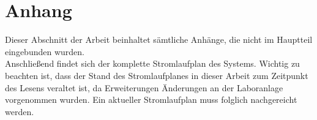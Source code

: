 \documentclass[../Bachelorarbeit.tex]{subfiles}
\begin{document}
\section*{Anhang} \label{anhang}
Dieser Abschnitt der Arbeit beinhaltet sämtliche Anhänge, die nicht im Hauptteil eingebunden wurden.\\
Anschließend findet sich der komplette Stromlaufplan des Systems. Wichtig zu beachten ist, dass der Stand des Stromlaufplanes in dieser Arbeit zum Zeitpunkt des Lesens veraltet ist, da Erweiterungen \bzw Änderungen an der Laboranlage vorgenommen wurden. Ein aktueller Stromlaufplan muss folglich nachgereicht werden.\\













\end{document}
